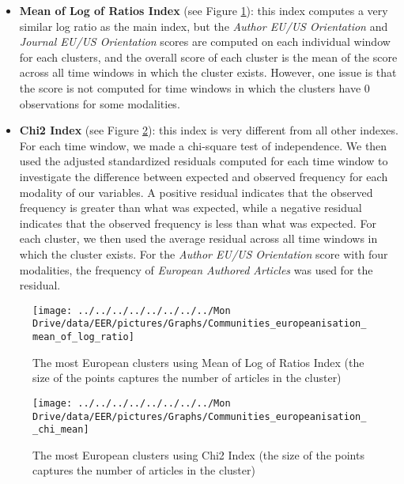 \documentclass[
  12pt,
  onecolumn]{article}
\providecommand{\tightlist}{%
  \setlength{\itemsep}{0pt}\setlength{\parskip}{0pt}}
\begin{document}
\begin{itemize}
\tightlist
\item
  \textbf{Mean of Log of Ratios Index} (see Figure
  \ref{fig:plot-mean-log-ratios}): this index computes a very similar
  log ratio as the main index, but the \emph{Author EU/US Orientation}
  and \emph{Journal EU/US Orientation} scores are computed on each
  individual window for each clusters, and the overall score of each
  cluster is the mean of the score across all time windows in which the
  cluster exists. However, one issue is that the score is not computed
  for time windows in which the clusters have 0 observations for some
  modalities.
\item
  \textbf{Chi2 Index} (see Figure \ref{fig:plot-chi-two-mean}): this
  index is very different from all other indexes. For each time window,
  we made a chi-square test of independence. We then used the adjusted
  standardized residuals computed for each time window to investigate
  the difference between expected and observed frequency for each
  modality of our variables. A positive residual indicates that the
  observed frequency is greater than what was expected, while a negative
  residual indicates that the observed frequency is less than what was
  expected. For each cluster, we then used the average residual across
  all time windows in which the cluster exists. For the \emph{Author
  EU/US Orientation} score with four modalities, the frequency of
  \emph{European Authored Articles} was used for the residual.
\end{itemize}

\begin{figure}[h]

{\centering \texttt{[image: ../../../../../../../../Mon Drive/data/EER/pictures/Graphs/Communities\_europeanisation\_mean\_of\_log\_ratio]} 

}

\caption{The most European clusters using Mean of Log of Ratios Index (the size of the points captures the number of articles in the cluster)}\label{fig:plot-mean-log-ratios}
\end{figure}

\begin{figure}[h]

{\centering \texttt{[image: ../../../../../../../../Mon Drive/data/EER/pictures/Graphs/Communities\_europeanisation\_\_chi\_mean]} 

}

\caption{The most European clusters using Chi2 Index (the size of the points captures the number of articles in the cluster)}\label{fig:plot-chi-two-mean}
\end{figure}
\end{document}
